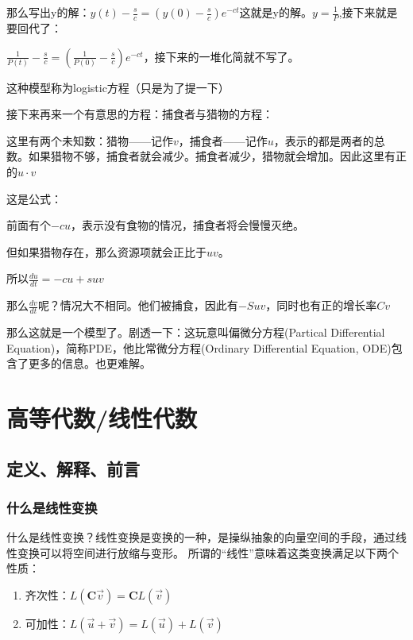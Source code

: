 \documentclass[UTF8]{ctexbook}
\begin{document}
{{{{  那么写出y的解：$y(t) - \frac{s}{c} = (y(0) - \frac{s}{c})e^{-ct}$这就是y的解。$y = \frac{1}{P}$,接下来就是要回代了：

  $\frac{1}{P(t)} - \frac{s}{c} = (\frac{1}{P(0)} - \frac{s}{c})e^{-ct}$，接下来的一堆化简就不写了。

  这种模型称为logistic方程（只是为了提一下）

  接下来再来一个有意思的方程：捕食者与猎物的方程：

  这里有两个未知数：猎物——记作$v$，捕食者——记作$u$，表示的都是两者的总数。如果猎物不够，捕食者就会减少。捕食者减少，猎物就会增加。因此这里有正的$u \cdot v$

  这是公式：

  前面有个$-cu$，表示没有食物的情况，捕食者将会慢慢灭绝。

  但如果猎物存在，那么资源项就会正比于$uv$。

  所以$\frac{du}{dt} = -cu + suv$

  那么$\frac{dv}{dt}$呢？情况大不相同。他们被捕食，因此有$-Suv$，同时也有正的增长率$Cv$

  那么这就是一个模型了。剧透一下：这玩意叫偏微分方程(Partical Differential Equation)，简称PDE，他比常微分方程(Ordinary Differential Equation, ODE)包含了更多的信息。也更难解。

}%

}%

}%

\section{高等代数/线性代数}{
\subsection{定义、解释、前言}{
\subsubsection{什么是线性变换}{
  什么是线性变换？线性变换是变换的一种，是操纵抽象的向量空间的手段，通过线性变换可以将空间进行放缩与变形。
  所谓的“线性”意味着这类变换满足以下两个性质：

  \begin{enumerate}
    \item 齐次性：$L(\mathbf{C}\vec{v}) = \mathbf{C}L(\vec{v})$
    \item 可加性：$L(\vec{u}+\vec{v}) = L(\vec{u})+L(\vec{v})$
  \end{enumerate}

}}}}
\end{document}
